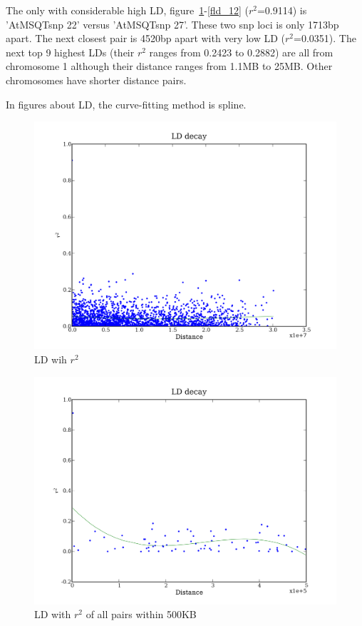 \documentclass[a4paper,10pt]{article}
\begin{document}
The only with considerable high LD, figure~\ref{fld_1}-\ref{fld_12} ($r^2$=0.9114) is 'AtMSQTsnp 22' versus 'AtMSQTsnp 27'. These two snp loci is only 1713bp apart. The next closest pair is 4520bp apart with very low LD ($r^2$=0.0351). The next top 9 highest LDs (their $r^2$ ranges from 0.2423 to 0.2882) are all from chromosome 1 although their distance ranges from 1.1MB to 25MB. Other chromosomes have shorter distance pairs.

In figures about LD, the curve-fitting method is spline.

\begin{figure}
\includegraphics[width=1\textwidth]{figures/data_d110_c0_5_LD_r2_0.png}
\caption{LD wih $r^2$}\label{fld_1}
\end{figure}

\begin{figure}
\includegraphics[width=1\textwidth]{figures/data_d110_c0_5_LD_r2_500000.png}
\caption{LD with $r^2$ of all pairs within 500KB}\label{fld_2}
\end{figure}
\end{document}
